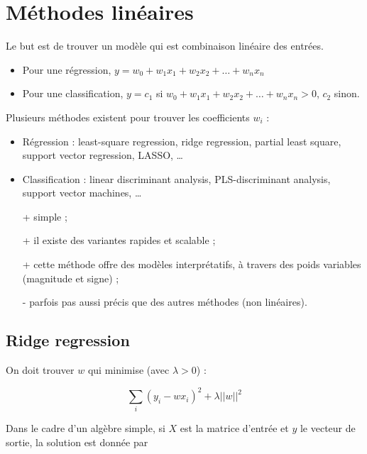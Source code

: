 \chapter{Méthodes linéaires}

Le but est de trouver un modèle qui est combinaison linéaire des entrées.

\begin{itemize}
	\item Pour une régression, $y = w_0 + w_1 x_1 + w_2 x_2 + \dots + w_n x_n$
	\item Pour une classification, $y = c_1$ si $w_0 + w_1 x_1 + w_2 x_2 + \dots + w_n x_n > 0$, $c_2$ sinon.
\end{itemize}


Plusieurs méthodes existent pour trouver les coefficients $w_i$ : 

\begin{itemize}
	\item Régression : least-square regression, ridge regression, partial least square, support vector regression, LASSO, \dots
	\item Classification : linear discriminant analysis, PLS-discriminant analysis, support vector machines, \dots \\
\end{itemize} 

\begin{itemize}
	\item[+] simple ;
	\item[+] il existe des variantes rapides et scalable ;
	\item[+] cette méthode offre des modèles interprétatifs, à travers des poids variables (magnitude et signe) ;
	\item[-] parfois pas aussi précis que des autres méthodes (non linéaires).
\end{itemize}

	\section{Ridge regression}
	
	On doit trouver $w$ qui minimise (avec $\lambda > 0$) :
	
	$$\sum_i (y_i - wx_i)^2 + \lambda \vert \vert w \vert \vert^2$$
	
	Dans le cadre d'un algèbre simple, si $X$ est la matrice d'entrée et $y$ le vecteur de sortie, la solution est donnée par
	
